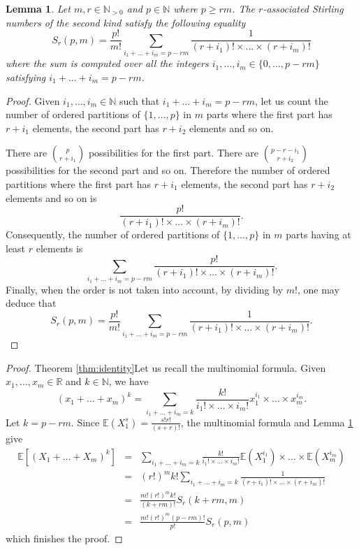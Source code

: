 \documentclass{article}
\theoremstyle{plain}
\newtheorem{lemma}[theorem]{Lemma}
\newcommand{\N}{{\mathbb N}}
\newcommand{\E}{{\mathbb E}}
\newcommand{\R}{{\mathbb R}}
\begin{document}
\begin{lemma}
\label{lem:identity}
Let $m,r\in \N_{>0}$ and $p\in \N$ where $p\ge rm$. The $r$-associated Stirling numbers of the second kind satisfy the following equality
\[S_r(p,m)=\frac{p!}{m!}\sum_{i_1+\dots+i_m=p-rm}\frac{1}{(r+i_1)!\times\ldots\times(r+i_m)!}\]
where the sum is computed over all the integers $i_1,\dots,i_m\in \{0,\dots,p-rm\}$ satisfying $i_1+\dots+i_m=p-rm$.
\end{lemma}
\begin{proof}
Given $i_1,\dots,i_m\in \N$  such that 
$i_1+\dots+i_m=p-rm$, let us count the number of ordered partitions 
of $\{1,\dots,p\}$
in $m$ parts where the first part has $r+i_1$ elements,
the second part has $r+i_2$ elements and so on.

There are $\binom{p}{r+i_1}$ possibilities for the first part.
 There are $\binom{p-r-i_1}{r+i_2}$ possibilities for the second part and so on. Therefore the number of ordered partitions where the first part has $r+i_1$ elements,
 the second part has $r+i_2$ elements and so on is 
\[\frac{p!}{(r+i_1)!\times\ldots\times (r+i_m)!}.\]
Consequently, the number of ordered partitions of $\{1,\dots,p\}$ in $m$ parts having at least $r$ elements is 
\[
\sum_{i_1+\dots+i_m=p-rm}\frac{p!}{(r+i_1)!\times\ldots\times(r+i_m)!}.
\]
Finally, when the order is not taken into account, by dividing by $m!$, 
one may deduce that
\[
S_r(p,m)=\frac{p!}{m!}\sum_{i_1+\dots+i_m=p-rm}\frac{1}{(r+i_1)!\times\ldots\times(r+i_m)!}.  
\] 
\end{proof}

\begin{proof}{Theorem {\ref{thm:identity}}}Let us recall the multinomial formula. Given $x_1,\dots,x_m\in \R$ and $k\in \N$, we have 
\[
(x_1+\dots+x_m)^{k}=\sum_{i_1+\dots+i_m=k}\frac{k!}{i_1! \times \dots \times i_m!}x_1^{i_1}\times\ldots\times x_m^{i_m}.
\]
Let $k=p-r m$. Since $\E(X_1^s)=\frac{s!r!}{(s+r)!}$, the multinomial formula and Lemma \ref{lem:identity} give 
\begin{eqnarray*}\E\left[ \left(X_1+\dots+X_m\right)^k\right] &=& \sum_{i_1+\dots+i_m=k}\frac{k!}{i_1!\times \dots \times i_m!} \E(X_1^{i_1})\times\ldots\times \E(X_m^{i_m})\\
&=& (r!)^mk!\sum_{i_1+\dots+i_m=k}\frac{1}{(r+i_1)!\times \dots \times (r+i_m)!}\\
&=&\frac{m!(r!)^m k!}{(k+rm)!}S_r(k+rm,m)\\
&=&\frac{m!(r!)^m (p-rm)!}{p!}S_r(p,m) 
\end{eqnarray*}
which finishes the proof. 
\end{proof}
\end{document}
